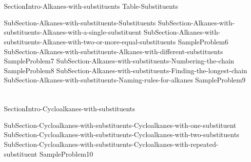 \documentclass[main.tex]{subfiles}
\begin{document}
 
\section{\color{blue!30!black}{Alkanes with substituents}}
{SectionIntro-Alkanes-with-substituents}\sloppy
{Table-Substituents}
\begin{description}
{SubSection-Alkanes-with-substituents-Substituents}
{SubSection-Alkanes-with-substituents-Alkanes-with-a-single-substituent}
{SubSection-Alkanes-with-substituents-Alkanes-with-two-or-more-equal-substituents}
{SampleProblem6}
{SubSection-Alkanes-with-substituents-Alkanes-with-different-substituents}
{SampleProblem7}
{SubSection-Alkanes-with-substituents-Numbering-the-chain}
{SampleProblem8}
{SubSection-Alkanes-with-substituents-Finding-the-longest-chain}
{SubSection-Alkanes-with-substituents-Naming-rules-for-alkanes}
{SampleProblem9}
\end{description}




\section{\color{blue!30!black}{Cycloalkanes with substituents}}
{SectionIntro-Cycloalkanes-with-substituents}\sloppy
\begin{description}
{SubSection-Cycloalkanes-with-substituents-Cycloalkanes-with-one-substituent}
{SubSection-Cycloalkanes-with-substituents-Cycloalkanes-with-two-substituents}
{SubSection-Cycloalkanes-with-substituents-Cycloalkanes-with-repeated-substituent}
{SampleProblem10}
\end{description}




\newpage
\end{document}
